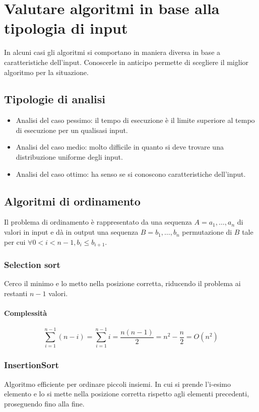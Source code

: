 \section{Valutare algoritmi in base alla tipologia di input}
In alcuni casi gli algoritmi si comportano in maniera diversa in base a caratteristiche dell'input. Conoscerle in anticipo permette di scegliere il miglior
algoritmo per la situazione. 
\subsection{Tipologie di analisi}
\begin{itemize}
\item Analisi del caso pessimo: il tempo di esecuzione \`e il limite superiore al tempo di esecuzione per un qualisasi input. 
\item Analisi del caso medio: molto difficile in quanto si deve trovare una distribuzione uniforme degli input.
\item Analisi del caso ottimo: ha senso se si conoscono caratteristiche dell'input.
\end{itemize}
\subsection{Algoritmi di ordinamento}
Il problema di ordinamento \`e rappresentato da una sequenza $A=a_1, \dots, a_n$ di valori in input e d\`a in output una sequenza $B=b_1, \dots, b_n$ 
permutazione di $B$ tale per cui $\forall 0<i<n-1, b_i\le b_{i+1}$.
\subsubsection{Selection sort}
Cerco il minimo e lo metto nella posizione corretta, riducendo il problema ai restanti $n-1$ valori.



\paragraph{Complessit\`a}
\begin{equation*}
\sum\limits_{i=1}^{n-1}(n-i)=\sum\limits_{i=1}^{n-1}i=\dfrac{n(n-1)}{2}=n^2-\dfrac{n}{2}=O(n^2)
\end{equation*}
\subsubsection{InsertionSort}
Algoritmo efficiente per ordinare piccoli insiemi. In cui si prende l'i-esimo elemento e lo si mette nella posizione corretta rispetto agli elementi
precedenti, proseguendo fino alla fine.

